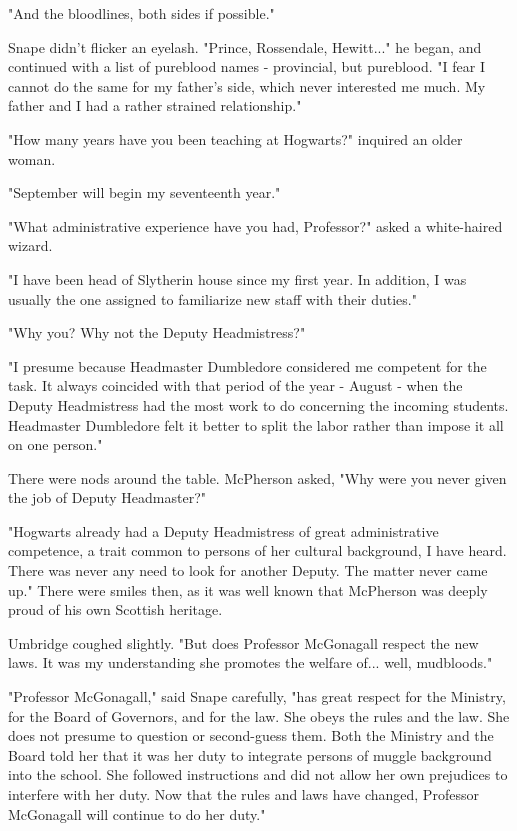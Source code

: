 "And the bloodlines, both sides if possible."

Snape didn't flicker an eyelash. "Prince, Rossendale, Hewitt..." he began, and continued with a list of pureblood names - provincial, but pureblood. "I fear I cannot do the same for my father's side, which never interested me much. My father and I had a rather strained relationship."

"How many years have you been teaching at Hogwarts?" inquired an older woman.

"September will begin my seventeenth year."

"What administrative experience have you had, Professor?" asked a white-haired wizard.

"I have been head of Slytherin house since my first year. In addition, I was usually the one assigned to familiarize new staff with their duties."

"Why you? Why not the Deputy Headmistress?"

"I presume because Headmaster Dumbledore considered me competent for the task. It always coincided with that period of the year - August - when the Deputy Headmistress had the most work to do concerning the incoming students. Headmaster Dumbledore felt it better to split the labor rather than impose it all on one person."

There were nods around the table. McPherson asked, "Why were you never given the job of Deputy Headmaster?"

"Hogwarts already had a Deputy Headmistress of great administrative competence, a trait common to persons of her cultural background, I have heard. There was never any need to look for another Deputy. The matter never came up." There were smiles then, as it was well known that McPherson was deeply proud of his own Scottish heritage.

Umbridge coughed slightly. "But does Professor McGonagall respect the new laws. It was my understanding she promotes the welfare of... well, mudbloods."

"Professor McGonagall," said Snape carefully, "has great respect for the Ministry, for the Board of Governors, and for the law. She obeys the rules and the law. She does not presume to question or second-guess them. Both the Ministry and the Board told her that it was her duty to integrate persons of muggle background into the school. She followed instructions and did not allow her own prejudices to interfere with her duty. Now that the rules and laws have changed, Professor McGonagall will continue to do her duty."

